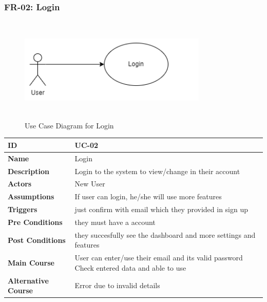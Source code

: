     \subsubsection{FR-02: Login}
    \begin{figure}[H]
        \includegraphics[height=5cm, width=0.8\textwidth]{./diagrams/Use Case/u2.png}
        \centering 
        \caption{Use Case Diagram for Login}
        \label{Usecase1}
        \end{figure}
        
    
    \begin{center}
        \begin{tabularx}{\textwidth}{|l|X|}
            \hline
            \textbf{ID} & UC-02 \\
            \hline
            \textbf{Name} & Login \\
            \hline
            \textbf{Description} & Login to the system to view/change in their account \\
            \hline
            \textbf{Actors} & New User \\
            \hline
            \textbf{Assumptions} & If user can login, he/she will use more features \\
            \hline
            \textbf{Triggers} & just confirm with email which they provided in sign up \\
            \hline
            \textbf{Pre Conditions} & they must have a account \\
            \hline
            \textbf{Post Conditions} & they succesfully see the dashboard and more settings and features \\
            \hline
            \textbf{Main Course} & User can enter/use their email and its valid password Check entered data and able to use \\
            \hline
            \textbf{Alternative Course} & Error due to invalid details \\
            \hline
            
        \end{tabularx}
    \end{center}
    \newpage
    

